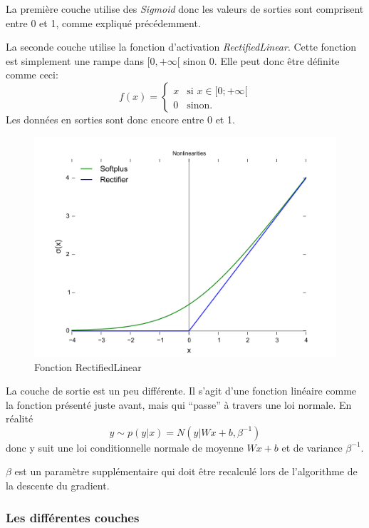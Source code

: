 \documentclass[12pt, a4paper]{article}
\begin{document}
La première couche utilise des \emph{Sigmoid} donc les valeurs de sorties sont comprisent entre 0 et 1, comme expliqué précédemment.

La seconde couche utilise la fonction d'activation \emph{RectifiedLinear}. Cette fonction est simplement une rampe dans $[0 , +\infty[$ sinon 0. Elle peut donc être définite comme ceci:
$$f(x) = \left\{
        \begin{array}{ll}
          x & \mbox{si } x \in [0;+\infty[ \\
          0 & \mbox{sinon.}
        \end{array}
      \right.$$
 Les données en sorties sont donc encore entre 0 et 1.

 \begin{figure}[h!]
  \centering
  \includegraphics[scale=0.4]{Images/rectified.png}
  \caption{Fonction RectifiedLinear}
\end{figure}

La couche de sortie est un peu différente. Il s'agit d'une fonction linéaire comme la fonction présenté juste avant, mais qui ``passe'' à travers une loi normale. En réalité $$ y \sim p(y | x) = N(y | Wx+b, \beta^{-1}) $$ donc y suit une loi conditionnelle normale de moyenne $Wx+b$ et de variance $\beta^{-1}$.

$\beta$ est un paramètre supplémentaire qui doit être recalculé lors de l'algorithme de la descente du gradient.

	\subsubsection{Les différentes couches}
	
\end{document}
